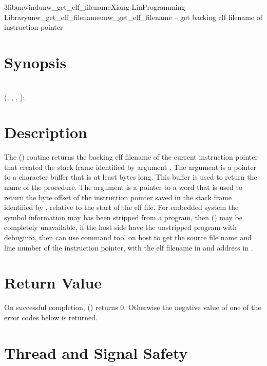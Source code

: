 \documentclass{article}
\begin{document}
\begin{Name}{3libunwind}{unw\_get\_elf\_filename}{Xiang Lin}{Programming Library}{unw\_get\_elf\_filename}unw\_get\_elf\_filename -- get backing elf filename of instruction pointer
\end{Name}

\section{Synopsis}

\\

 (, ,  , );\\

\section{Description}

The () routine returns the backing elf
filename of the current instruction pointer that created the stack frame
identified by argument .  The  argument is a pointer
to a character buffer that is at least  bytes long.  This buffer
is used to return the name of the procedure.  The  argument is
a pointer to a word that is used to return the byte offset of the instruction
pointer saved in the stack frame identified by , relative to the
start of the elf file. For embedded system the symbol information may has
been stripped from a program, then () may be
completely unavailable, if the host side have the unstripped program with
debuginfo, then can use  command tool on host to get the
source file name and line number of the instruction pointer, with the elf
filename in  and address in .

\section{Return Value}

On successful completion, () returns 0.
Otherwise the negative value of one of the error codes below is
returned.

\section{Thread and Signal Safety}
\end{document}
